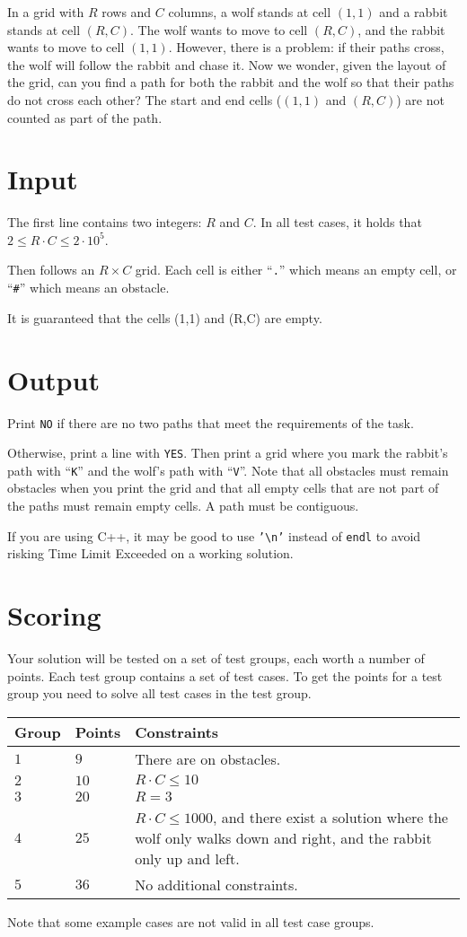 \noindent
In a grid with $R$ rows and $C$ columns, a wolf stands at cell $(1, 1)$ and a rabbit stands at cell $(R, C)$.
The wolf wants to move to cell $(R, C)$, and the rabbit wants to move to cell $(1, 1)$.
However, there is a problem: if their paths cross, the wolf will follow the rabbit and chase it.
Now we wonder, given the layout of the grid, can you find a path for both the rabbit and the wolf so that their paths do not cross each other?
The start and end cells ($(1, 1)$ and $(R, C)$) are not counted as part of the path.

\section*{Input}
The first line contains two integers: $R$ and $C$. In all test cases, it holds that $2 \leq R \cdot C \leq 2 \cdot 10^5$.

Then follows an $R \times C$ grid. Each cell is either ``\texttt{.}'' which means an empty cell, or ``\texttt{\#}'' which means an obstacle.

It is guaranteed that the cells (1,1) and (R,C) are empty.

\section*{Output}
Print \texttt{NO} if there are no two paths that meet the requirements of the task.

Otherwise, print a line with \texttt{YES}.
Then print a grid where you mark the rabbit's path with ``\texttt{K}'' and the wolf's path with ``\texttt{V}''.
Note that all obstacles must remain obstacles when you print the grid and that all empty cells that are not part of the paths must remain empty cells.
A path must be contiguous.

If you are using C++, it may be good to use \texttt{'\textbackslash{}n'} instead of \texttt{endl} to avoid risking Time Limit Exceeded on a working solution.

\section*{Scoring}
Your solution will be tested on a set of test groups, each worth a number of points. Each test group contains
a set of test cases. To get the points for a test group you need to solve all test cases in the test group.

\noindent
\begin{tabular}{| l | l | l |}
  \hline
  \textbf{Group} & \textbf{Points} & \textbf{Constraints} \\ \hline
  $1$   & $9$        & There are on obstacles. \\ \hline
  $2$   & $10$       & $R \cdot C \leq 10$  \\ \hline
  $3$   & $20$       & $R = 3$  \\ \hline
  $4$   & $25$       & $R \cdot C \leq 1000$, and there exist a solution where the wolf only walks down and right, and the rabbit only up and left. \\ \hline
  $5$   & $36$       & No additional constraints. \\ \hline
\end{tabular}

Note that some example cases are not valid in all test case groups.
